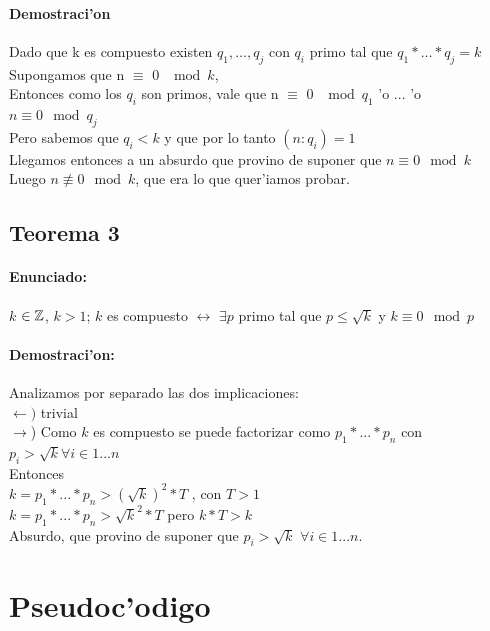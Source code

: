 \paragraph{Demostraci'on}
Dado que k es compuesto existen $q_1,\ldots,q_j$ con $q_i$ primo tal que $q_1*\ldots*q_j = k$ \\
Supongamos que n $\equiv$ 0 $\mod{k}$,\\
Entonces como los $q_i$ son primos, vale que n $\equiv$ 0 $\mod{q_1}$ 'o ... 'o $n \equiv 0 \mod{q_j}$ \\
Pero sabemos que $q_i < k$ y que por lo tanto $(n:q_{i}) = 1$ \\
Llegamos entonces a un absurdo que provino de suponer que  $n \equiv 0 \mod{k}$ \\ 
Luego $n \not\equiv 0 \mod{k}$, que era lo que quer'iamos probar.

\subsection{Teorema 3}
\label{demo3}
\paragraph{Enunciado:}
$k$ ${\in {\mathbb Z}}$, $k>1$; $k$ es compuesto $\longleftrightarrow$ $\exists p$ primo tal que $p \leq \sqrt{k}$ y $k \equiv 0 \mod{p}$
\paragraph{Demostraci'on:}
Analizamos por separado las dos implicaciones: \\
$\leftarrow)$ trivial \\
$\rightarrow$) Como $k$ es compuesto se puede factorizar como $p_1*...*p_n$ con $p_i > \sqrt{k} \forall i \in {1...n}$\\
Entonces \\
$k = p_1*...*p_n > (\sqrt{k})^2*T$ , con $T>1$\\  
$k = p_1*...*p_n > \sqrt{k}^2*T$ pero $k*T > k$ \\
Absurdo, que provino de suponer que $p_i > \sqrt{k}$ $\forall i \in {1...n}$.\\

\section{Pseudoc'odigo}


